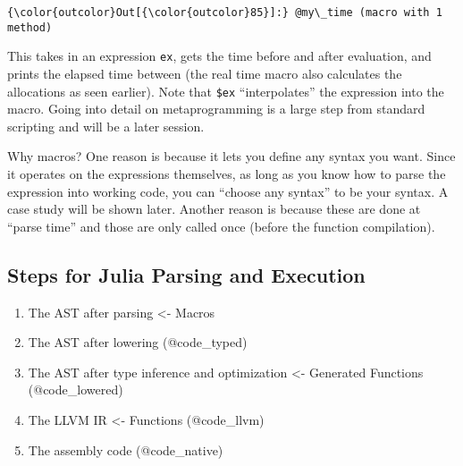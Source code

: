\documentclass[11pt]{article}
\begin{document}
            \begin{Verbatim}[commandchars=\\\{\}]
{\color{outcolor}Out[{\color{outcolor}85}]:} @my\_time (macro with 1 method)
\end{Verbatim}
        
    This takes in an expression \texttt{ex}, gets the time before and after
evaluation, and prints the elapsed time between (the real time macro
also calculates the allocations as seen earlier). Note that
\texttt{\$ex} ``interpolates'' the expression into the macro. Going into
detail on metaprogramming is a large step from standard scripting and
will be a later session.

Why macros? One reason is because it lets you define any syntax you
want. Since it operates on the expressions themselves, as long as you
know how to parse the expression into working code, you can ``choose any
syntax'' to be your syntax. A case study will be shown later. Another
reason is because these are done at ``parse time'' and those are only
called once (before the function compilation).

    \subsection{Steps for Julia Parsing and
Execution}\label{steps-for-julia-parsing-and-execution}

\begin{enumerate}
\def\labelenumi{\arabic{enumi}.}
\itemsep1pt\parskip0pt
\item
  The AST after parsing \textless{}- Macros
\item
  The AST after lowering (@code\_typed)
\item
  The AST after type inference and optimization \textless{}- Generated
  Functions (@code\_lowered)
\item
  The LLVM IR \textless{}- Functions (@code\_llvm)
\item
  The assembly code (@code\_native)
\end{enumerate}


    
    
    
    
\end{document}
